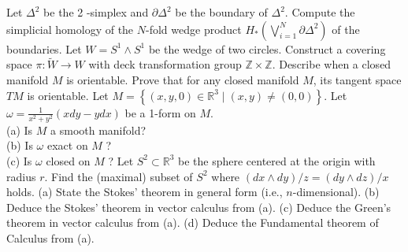 \documentclass[14pt]{extarticle}
\begin{document}
\newpage
Let $\Delta^{2}$ be the 2 -simplex and $\partial \Delta^{2}$ be the boundary of $\Delta^{2}$. Compute the simplicial homology of the $N$-fold wedge product $H_{*}\left(\bigvee_{i=1}^{N} \partial \Delta^{2}\right)$ of the boundaries.
\newpage
Let $W=S^{1} \wedge S^{1}$ be the wedge of two circles. Construct a covering space $\pi: \tilde{W} \rightarrow W$ with deck transformation group $\mathbb{Z} \times \mathbb{Z}$.
\newpage
Describe when a closed manifold $M$ is orientable. Prove that for any closed manifold $M$, its tangent space $T M$ is orientable.
\newpage
Let $M=\left\{(x, y, 0) \in \mathbb{R}^{3} \mid(x, y) \neq(0,0)\right\}$. Let $\omega=\frac{1}{x^{2}+y^{2}}(x d y-y d x)$ be a 1-form on $M$.\\
(a) Is $M$ a smooth manifold?\\
(b) Is $\omega$ exact on $M$ ?\\
(c) Is $\omega$ closed on $M$ ?
\newpage
Let $S^{2} \subset \mathbb{R}^{3}$ be the sphere centered at the origin with radius $r$. Find the (maximal) subset of $S^{2}$ where $(d x \wedge d y) / z=(d y \wedge d z) / x$ holds.
(a) State the Stokes' theorem in general form (i.e., $n$-dimensional).
(b) Deduce the Stokes' theorem in vector calculus from (a).
(c) Deduce the Green's theorem in vector calculus from (a).
(d) Deduce the Fundamental theorem of Calculus from (a).
\newpage
\end{document}
